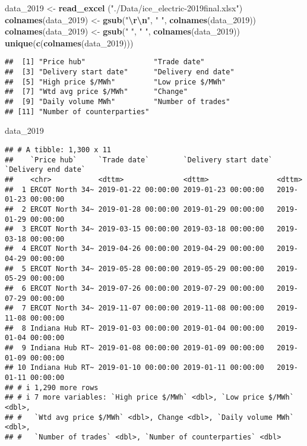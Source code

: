 \documentclass[
]{article}
\newenvironment{Shaded}{\begin{snugshade}}{\end{snugshade}}
\newcommand{\FunctionTok}[1]{\textcolor[rgb]{0.13,0.29,0.53}{\textbf{#1}}}
\newcommand{\NormalTok}[1]{#1}
\newcommand{\OtherTok}[1]{\textcolor[rgb]{0.56,0.35,0.01}{#1}}
\newcommand{\SpecialCharTok}[1]{\textcolor[rgb]{0.81,0.36,0.00}{\textbf{#1}}}
\newcommand{\StringTok}[1]{\textcolor[rgb]{0.31,0.60,0.02}{#1}}
\begin{document}
\begin{Shaded}
\begin{Highlighting}[]
\NormalTok{data\_2019 }\OtherTok{\textless{}{-}} \FunctionTok{read\_excel}\NormalTok{ (}\StringTok{"./Data/ice\_electric{-}2019final.xlsx"}\NormalTok{)}
\FunctionTok{colnames}\NormalTok{(data\_2019) }\OtherTok{\textless{}{-}} \FunctionTok{gsub}\NormalTok{(}\StringTok{"}\SpecialCharTok{\textbackslash{}r\textbackslash{}n}\StringTok{"}\NormalTok{, }\StringTok{" "}\NormalTok{, }\FunctionTok{colnames}\NormalTok{(data\_2019))}
\FunctionTok{colnames}\NormalTok{(data\_2019) }\OtherTok{\textless{}{-}} \FunctionTok{gsub}\NormalTok{(}\StringTok{"  "}\NormalTok{, }\StringTok{" "}\NormalTok{, }\FunctionTok{colnames}\NormalTok{(data\_2019))}
\FunctionTok{unique}\NormalTok{(}\FunctionTok{c}\NormalTok{(}\FunctionTok{colnames}\NormalTok{(data\_2019)))}
\end{Highlighting}
\end{Shaded}

\begin{verbatim}
##  [1] "Price hub"                "Trade date"              
##  [3] "Delivery start date"      "Delivery end date"       
##  [5] "High price $/MWh"         "Low price $/MWh"         
##  [7] "Wtd avg price $/MWh"      "Change"                  
##  [9] "Daily volume MWh"         "Number of trades"        
## [11] "Number of counterparties"
\end{verbatim}

\begin{Shaded}
\begin{Highlighting}[]
\NormalTok{data\_2019}
\end{Highlighting}
\end{Shaded}

\begin{verbatim}
## # A tibble: 1,300 x 11
##    `Price hub`     `Trade date`        `Delivery start date` `Delivery end date`
##    <chr>           <dttm>              <dttm>                <dttm>             
##  1 ERCOT North 34~ 2019-01-22 00:00:00 2019-01-23 00:00:00   2019-01-23 00:00:00
##  2 ERCOT North 34~ 2019-01-28 00:00:00 2019-01-29 00:00:00   2019-01-29 00:00:00
##  3 ERCOT North 34~ 2019-03-15 00:00:00 2019-03-18 00:00:00   2019-03-18 00:00:00
##  4 ERCOT North 34~ 2019-04-26 00:00:00 2019-04-29 00:00:00   2019-04-29 00:00:00
##  5 ERCOT North 34~ 2019-05-28 00:00:00 2019-05-29 00:00:00   2019-05-29 00:00:00
##  6 ERCOT North 34~ 2019-07-26 00:00:00 2019-07-29 00:00:00   2019-07-29 00:00:00
##  7 ERCOT North 34~ 2019-11-07 00:00:00 2019-11-08 00:00:00   2019-11-08 00:00:00
##  8 Indiana Hub RT~ 2019-01-03 00:00:00 2019-01-04 00:00:00   2019-01-04 00:00:00
##  9 Indiana Hub RT~ 2019-01-08 00:00:00 2019-01-09 00:00:00   2019-01-09 00:00:00
## 10 Indiana Hub RT~ 2019-01-10 00:00:00 2019-01-11 00:00:00   2019-01-11 00:00:00
## # i 1,290 more rows
## # i 7 more variables: `High price $/MWh` <dbl>, `Low price $/MWh` <dbl>,
## #   `Wtd avg price $/MWh` <dbl>, Change <dbl>, `Daily volume MWh` <dbl>,
## #   `Number of trades` <dbl>, `Number of counterparties` <dbl>
\end{verbatim}
\end{document}
